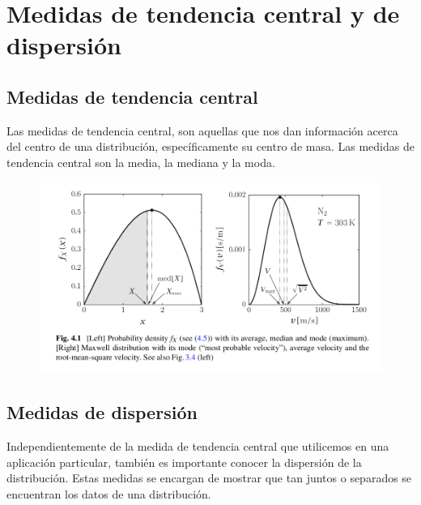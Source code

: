 \section{Medidas de tendencia central y de dispersión}

\subsection{Medidas de tendencia central}

Las medidas de tendencia central, son aquellas que nos dan información acerca
del centro de una distribución, específicamente su centro de masa. Las medidas
de tendencia central son la media, la mediana y la moda.

\begin{figure}[h!]
  \centering
  \includegraphics[scale=0.41]{../slides/figures/mean_median_mode_sirca.png}
\end{figure}
  
  
\subsection{Medidas de dispersión}

Independientemente de la medida de tendencia central que utilicemos en una
aplicación particular, también es importante conocer la dispersión de la
distribución. Estas medidas se encargan de mostrar que tan juntos o separados se
encuentran los datos de una distribución.

